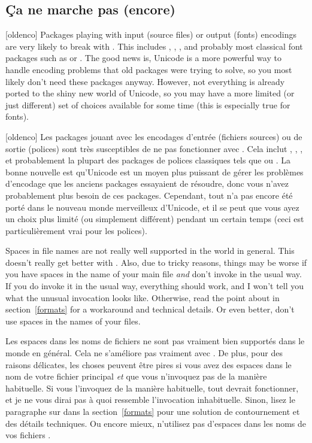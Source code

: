 \documentclass{lltxdoc}
\begin{document}
\subsection{Ça ne marche pas (encore)}\label{notworking}

[oldenco] Packages playing with input (source files) or
output (fonts) encodings are very likely to break with \luatex. This includes
, , , and probably most classical font
packages such as  or . The good news
is, Unicode is a more powerful way to handle encoding problems that old
packages were trying to solve, so you most likely don't need these packages
anyway. However, not everything is already ported to the shiny new world of
Unicode, so you may have a more limited (or just different) set of choices
available for some time (this is especially true for fonts).

[oldenco] Les packages jouant avec les encodages d'entrée (fichiers sources) ou de sortie (polices) sont très susceptibles de ne pas fonctionner avec \luatex. Cela inclut , , , et probablement la plupart des packages de polices classiques tels que  ou . La bonne nouvelle est qu'Unicode est un moyen plus puissant de gérer les problèmes d'encodage que les anciens packages essayaient de résoudre, donc vous n'avez probablement plus besoin de ces packages. Cependant, tout n'a pas encore été porté dans le nouveau monde merveilleux d'Unicode, et il se peut que vous ayez un choix plus limité (ou simplement différent) pendant un certain temps (ceci est particulièrement vrai pour les polices).

 Spaces in file names are not really well supported in the \tex
world in general. This doesn't really get better with \luatex. Also, due to
tricky reasons, things may be worse if you have spaces in the name of your main
\tex file \emph{and} don't invoke \luatex in the usual way. If you do
invoke it in the usual way, everything should work, and I won't tell you what
the unusual invocation looks like. Otherwise, read the point about
 in section~\ref{formats} for a workaround and technical
details. Or even better, don't use spaces in the names of your \tex files.

 Les espaces dans les noms de fichiers ne sont pas vraiment bien supportés dans le monde \tex en général. Cela ne s'améliore pas vraiment avec \luatex. De plus, pour des raisons délicates, les choses peuvent être pires si vous avez des espaces dans le nom de votre fichier \tex principal \emph{et} que vous n'invoquez pas \luatex de la manière habituelle. Si vous l'invoquez de la manière habituelle, tout devrait fonctionner, et je ne vous dirai pas à quoi ressemble l'invocation inhabituelle. Sinon, lisez le paragraphe sur  dans la section~\ref{formats} pour une solution de contournement et des détails techniques. Ou encore mieux, n'utilisez pas d'espaces dans les noms de vos fichiers \tex.
\end{document}
